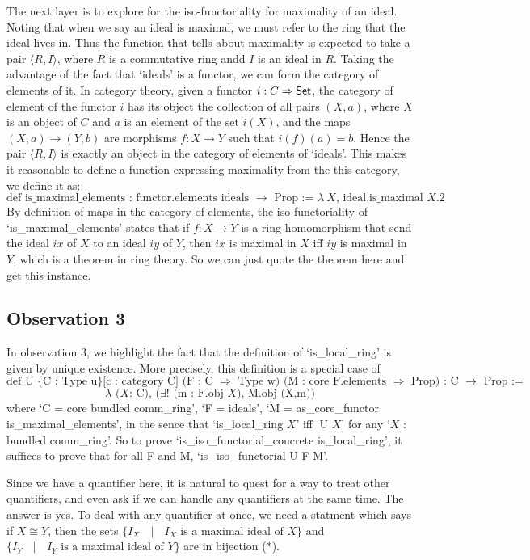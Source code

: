\documentclass[11pt]{article}
\begin{document}
The next layer is to explore for the iso-functoriality for maximality of an ideal. Noting that when we say an ideal is maximal, we must refer to the ring that the ideal lives in. Thus the function that tells about maximality is expected to take a pair $\langle R,I\rangle$, where $R$ is a commutative ring andd $I$ is an ideal in $R$. Taking the advantage of the fact that `ideals' is a functor, we can form the category of elements of it. In category theory, given a functor $i: C\Rightarrow {\sf Set}$, the category of element of the functor $i$ has its object the collection of all pairs $(X,a)$, where $X$ is an object of $C$ and $a$ is an element of the set $i(X)$, and the maps $(X,a)\to (Y,b)$ are morphisms $f:X\to Y$ such that $i(f)(a)=b$. Hence the pair $\langle R,I\rangle$ is exactly an object in the category of elements of `ideals'. This makes it reasonable to define a function expressing maximality from the this category, we define it as:
\[\text{def is\_maximal\_elements : functor.elements ideals $\to$ Prop := $\lambda \ X$, ideal.is\_maximal $X.2$}\]
By definition of maps in the category of elements, the iso-functoriality of `is\_maximal\_elements' states that if $f: X\to Y$ is a ring homomorphism that send the ideal $ix$ of $X$ to an ideal $iy$ of $Y$, then $ix$ is maximal in $X$ iff $iy$ is maximal in $Y$, which is a theorem in ring theory. So we can just quote the theorem here and get this instance.

\subsection{Observation 3}

In observation 3, we highlight the fact that the definition of `is\_local\_ring' is given by unique existence. More precisely, this definition is a special case of
\[\text{def U \{C : Type u\} [c : category C] (F : C $\Rightarrow$ Type w) (M : core F.elements $\Rightarrow$ Prop) : C $\to$ Prop :=}\]
\[\text{$\lambda$ ($X$: C), ($\exists !$ (m : F.obj $X$), M.obj (X,m))}\]
where `C = core bundled comm\_ring', `F = ideals', `M = as\_core\_functor is\_maximal\_elements', in the sence that `is\_local\_ring $X$' iff `U $X$' for any `$X$ : bundled comm\_ring'. So to prove `is\_iso\_functorial\_concrete is\_local\_ring', it suffices to prove that for all F and M, `is\_iso\_functorial U F M'.

Since we have a quantifier here, it is natural to quest for a way to treat other quantifiers, and even ask if we can handle any quantifiers at the same time. The answer is yes. To deal with any quantifier at once, we need a statment which says if $X\cong Y$, then the sets $\text{\{$I_X$ $\mid$ $I_X$ is a maximal ideal of $X$\}}$ and \newline
$\text{\{$I_Y$ $\mid$ $I_Y$ is a maximal ideal of $Y$\}}$ are in bijection ($*$). 
\end{document}
